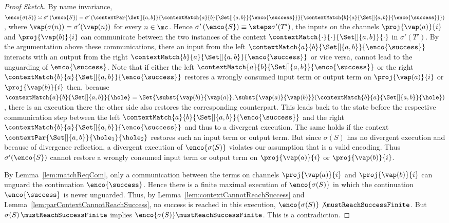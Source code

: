 \documentclass[final,copyright,creativecommons]{eptcs}
\begin{document}
\begin{proof}[Proof Sketch]
	By name invariance, $ \enco{\sigma\!\left( S \right)} \asymp \sigma'\left( \enco{S} \right) = \sigma'\left( \contextPar{\Set[]{ a, b }}{\contextMatch{a}{b}{\Set[]{ a, b }}{\enco{\success}}}{\contextMatch{b}{a}{\Set[]{ a, b }}{\enco{\success}}} \right) $, where \linebreak $ \vap\!\left( \sigma\!\left( n \right) \right) = \sigma'\!\left( \vap\!\left( n \right) \right) $ for every $ n \in \mc $.
	Hence $ \sigma'\left( \enco{S} \right) \equiv\steps \sigma'\!\left( T' \right) $, \ie the inputs on the channels $ \proj{\vap\!\left( a \right)}{i} $ and $ \proj{\vap\!\left( b \right)}{i} $ can communicate between the two instances of the context $ \contextMatch{\cdot}{\cdot}{\Set[]{ a, b }}{\cdot} $ in $ \sigma'\!\left( T' \right) $.
	By the argumentation above these communications, \ie there an input from the left $ \contextMatch{a}{b}{\Set[]{ a, b }}{\enco{\success}} $ interacts with an output from the right $ \contextMatch{b}{a}{\Set[]{ a, b }}{\enco{\success}} $ or vice versa, cannot lead to the unguarding of $ \enco{\success} $.
	Note that if either the left $ \contextMatch{a}{b}{\Set[]{ a, b }}{\enco{\success}} $ or the right $ \contextMatch{b}{a}{\Set[]{ a, b }}{\enco{\success}} $ restores a wrongly consumed input term or output term on $ \proj{\vap\!\left( a \right)}{i} $ or $ \proj{\vap\!\left( b \right)}{i} $ then, because $ \contextMatch{a}{b}{\Set[]{ a, b }}{\hole} = \Set{ \subst{\vap(b)}{\vap(a)}, \subst{\vap(a)}{\vap(b)} }\!\left( \contextMatch{b}{a}{\Set[]{ a, b }}{\hole} \right) $, there is an execution there the other side also restores the corresponding counterpart. This leads back to the state before the respective communication step between the left $ \contextMatch{a}{b}{\Set[]{ a, b }}{\enco{\success}} $ and the right $ \contextMatch{b}{a}{\Set[]{ a, b }}{\enco{\success}} $ and thus to a divergent execution.
	The same holds if the context $ \contextPar{\Set[]{ a, b }}{\hole_1}{\hole_2} $ restores such an input term or output term.
	But since $ \sigma\!\left( S \right) $ has no divergent execution and because of divergence reflection, a divergent execution of $ \enco{\sigma\!\left( S \right)} $ violates our assumption that \encod is a valid encoding.
	Thus $ \sigma'\!\left( \enco{S} \right) $ cannot restore a wrongly consumed input term or output term on $ \proj{\vap\!\left( a \right)}{i} $ or $ \proj{\vap\!\left( b \right)}{i} $.
	
	By Lemma~\ref{lem:matchReqCom}, only a communication between the terms on channels $ \proj{\vap\!\left( a \right)}{i} $ and $ \proj{\vap\!\left( b \right)}{i} $ can unguard the continuation $ \enco{\success} $. Hence there is a finite maximal execution of $ \enco{\sigma\!\left( S \right)} $ in which the continuation $ \enco{\success} $ is never unguarded.
	Thus, by Lemma~\ref{lem:contextCannotReachSuccess} and Lemma~\ref{lem:parContextCannotReachSuccess}, no success is reached in this execution, \ie $ \enco{\sigma\!\left( S \right)} \not\mustReachSuccessFinite $.
	But $ \sigma\!\left( S \right) \mustReachSuccessFinite $ implies $ \enco{\sigma\!\left( S \right)} \mustReachSuccessFinite $.
	This is a contradiction.
\end{proof}
\end{document}

